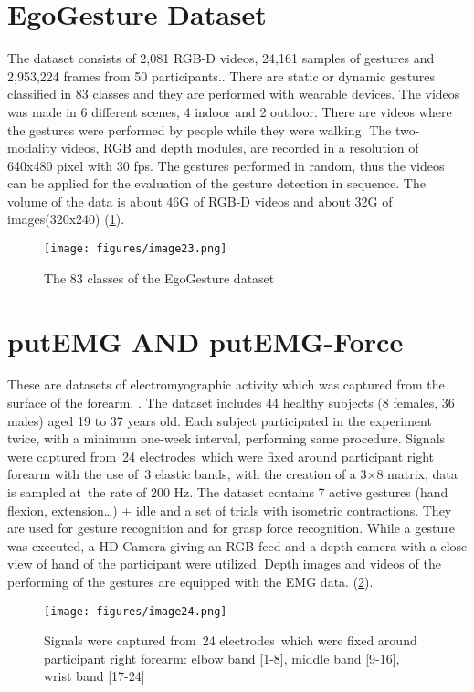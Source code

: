 \documentclass[12pt]{book}
\begin{document}
\section{EgoGesture Dataset}
The dataset consists of 2,081 RGB-D videos, 24,161 samples of gestures and 2,953,224 frames from 50 participants.\cite{EGO2018}. There are static or dynamic gestures classified in 83 classes and they are performed with wearable devices. The videos was made in 6 different scenes, 4 indoor and 2 outdoor. There are videos where the gestures were performed by people while they were walking. The two-modality videos, RGB and depth modules, are recorded in a resolution of 640x480 pixel with 30 fps. The gestures performed in random, thus the videos can be applied for the evaluation of the gesture detection in sequence. The volume of the data is about 46G of RGB-D videos and about 32G of images(320x240) (\ref{fig:fig15}). 

\begin{figure}[!htbp]
\centering
  \texttt{[image: figures/image23.png]}
  \\
  \caption{The 83 classes of the EgoGesture dataset \cite{EGO2018}}
  \label{fig:fig15}
\end{figure}

\section{putEMG AND putEMG-Force}
These are datasets of electromyographic activity which was captured from the surface of the forearm. \cite{PEM}. The dataset includes 44 healthy subjects (8 females, 36 males) aged 19 to 37 years old. Each subject participated in the experiment twice, with a minimum one-week interval, performing same procedure. Signals were captured from 24 electrodes which were fixed around participant right forearm with the use of 3 elastic bands, with the creation of a 3×8 matrix, data is sampled at the rate of 200 Hz. The dataset contains 7 active gestures (hand flexion, extension…) + idle and a set of trials with isometric contractions.
They are used for gesture recognition and for grasp force recognition. While a gesture was executed, a HD Camera giving an RGB feed and a depth camera with a close view of hand of the participant were utilized. Depth images and videos of the performing  of the gestures are equipped with the EMG data. (\ref{fig:fig16}).

\begin{figure}[!htbp]
\centering
  \texttt{[image: figures/image24.png]}
  \\
  \caption{Signals were captured from 24 electrodes which were fixed around participant right forearm: elbow band [1-8], middle band [9-16], wrist band [17-24] \cite{PEM}}
  \label{fig:fig16}
\end{figure}
\end{document}
